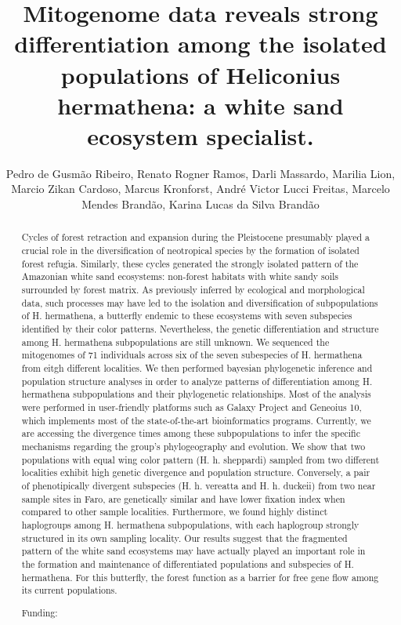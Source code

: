 \documentclass[twoside]{article}
\title{\vspace{-15mm}\fontsize{24pt}{10pt}\selectfont\textbf{ Mitogenome data reveals strong differentiation among the isolated populations of Heliconius hermathena: a white sand ecosystem specialist. }} %
\author{ Pedro de Gusm\~ao Ribeiro, Renato Rogner Ramos, Darli Massardo, Marilia Lion, Marcio Zikan Cardoso, Marcus Kronforst, Andr\'e Victor Lucci Freitas, Marcelo Mendes Brand\~ao, Karina Lucas da Silva Brand\~ao }
\affil{ UNICAMP }
\date{}
\begin{document}
  
  
  \maketitle %
  
  
  \thispagestyle{fancy} %
  
  
  \begin{abstract}
  Cycles of forest retraction and expansion during the Pleistocene presumably played a crucial role in the diversification of neotropical species by the formation of isolated forest refugia. Similarly,  these cycles generated the strongly isolated pattern of the Amazonian white sand ecosystems: non-forest habitats with white sandy soils surrounded by forest matrix. As previously inferred by ecological and morphological data,  such processes may have led to the isolation and diversification of subpopulations of H. hermathena,  a butterfly endemic to these ecosystems with seven subspecies identified by their color patterns. Nevertheless,  the genetic differentiation and structure among H. hermathena subpopulations are still unknown. We sequenced the mitogenomes of 71 individuals across six of the seven subespecies of H. hermathena from eitgh different localities. We then performed bayesian phylogenetic inference and population structure analyses in order to analyze patterns of differentiation among H. hermathena subpopulations and their phylogenetic relationships. Most of the analysis were performed in user-friendly platforms such as Galaxy Project and Geneoius 10,  which implements most of the state-of-the-art bioinformatics programs. Currently,  we are accessing the divergence times among these subpopulations to infer the specific mechanisms regarding the group’s phylogeography and evolution. We show that two populations with equal wing color pattern (H. h. sheppardi) sampled from two different localities exhibit high genetic divergence and population structure. Conversely,  a pair of phenotipically divergent subspecies (H. h. vereatta and H. h. duckeii) from two near sample sites in Faro,  are genetically similar and have lower fixation index when compared to other sample localities. Furthermore,  we found highly distinct haplogroups among H. hermathena subpopulations,  with each haplogroup strongly structured in its own sampling locality. Our results suggest that the fragmented pattern of the white sand ecosystems may have actually played an important role in the formation and maintenance of differentiated populations and subspecies of H. hermathena. For this butterfly,  the forest function as a barrier for free gene flow among its current populations.
  
  Funding:  \\ 
  \end{abstract}
  
\end{document}
